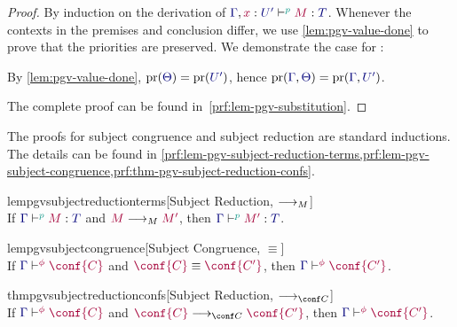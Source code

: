 \documentclass[main.tex]{subfiles}
\begin{document}
\begin{proof}
  By induction on the derivation of $\tseq[\cs{p}]{\ty{\Gamma},\tmty{x}{U'}}{M}{T}$. Whenever the contexts in the premises and conclusion differ, we use \cref{lem:pgv-value-done} to prove that the priorities are preserved. We demonstrate the case for :
  \begin{case*}
    By \cref{lem:pgv-value-done}, $\pr(\ty{\Theta})=\pr(\ty{U'})$, hence $\pr(\ty{\Gamma},\ty{\Theta})=\pr(\ty{\Gamma},\ty{U'})$.
    \begin{mathpar}
      \small
    \end{mathpar}
  \end{case*}
  The complete proof can be found in~\cref{prf:lem-pgv-substitution}.
\end{proof}
The proofs for subject congruence and subject reduction are standard inductions. The details can be found in \cref{prf:lem-pgv-subject-reduction-terms,prf:lem-pgv-subject-congruence,prf:thm-pgv-subject-reduction-confs}.
\begin{restatablelemma}{lempgvsubjectreductionterms}[Subject Reduction, $\tred$]
  \label{lem:pgv-subject-reduction-terms}
  \hfill\\%
  If $\tseq[\cs{p}]{\ty{\Gamma}}{M}{T}$ and $\tm{M}\tred\tm{M'}$,
  then $\tseq[\cs{p}]{\ty{\Gamma}}{M'}{T}$.
\end{restatablelemma}
\begin{restatablelemma}{lempgvsubjectcongruence}[Subject Congruence, $\equiv$]
  \label{lem:pgv-subject-congruence}
  \hfill\\%
  If $\cseq[\phi]{\ty{\Gamma}}{\conf{C}}$ and $\tm{\conf{C}}\equiv\tm{\conf{C'}}$,
  then $\cseq[\phi]{\ty{\Gamma}}{\conf{C'}}$.
\end{restatablelemma}
\begin{restatabletheorem}{thmpgvsubjectreductionconfs}[Subject Reduction, $\cred$]
  \label{thm:pgv-subject-reduction-confs}
  \hfill\\%
  If $\cseq[\phi]{\ty{\Gamma}}{\conf{C}}$ and $\tm{\conf{C}}\cred\tm{\conf{C'}}$,
  then $\cseq[\phi]{\ty{\Gamma}}{\conf{C'}}$.
\end{restatabletheorem}
\end{document}
